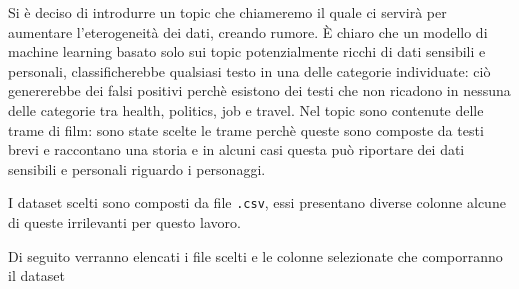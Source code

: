 \begin{table}[h]
\label{tbl:ds_scelti}
\begin{center}
    \fontsize{4.6mm}{4.6mm}
\end{center}
\caption{dataset scelti per ogni topic}
\end{table}
\FloatBarrier

Si è deciso di introdurre un topic che chiameremo  il quale ci servirà per aumentare l'eterogeneità dei dati, creando rumore. È chiaro che un modello di machine learning basato solo sui topic potenzialmente ricchi di dati sensibili e personali, classificherebbe qualsiasi testo in una delle categorie individuate: ciò genererebbe dei falsi positivi perchè esistono dei testi che non ricadono in nessuna delle categorie tra health, politics, job e travel. Nel topic  sono contenute delle trame di film: sono state scelte le trame perchè queste sono composte da testi brevi e raccontano una storia e in alcuni casi questa può riportare dei dati sensibili e personali riguardo i personaggi.

I dataset scelti sono composti da file {\tt .csv}, essi presentano diverse colonne alcune di queste irrilevanti per questo lavoro.

Di seguito verranno elencati i file scelti e le colonne selezionate che comporranno il dataset

